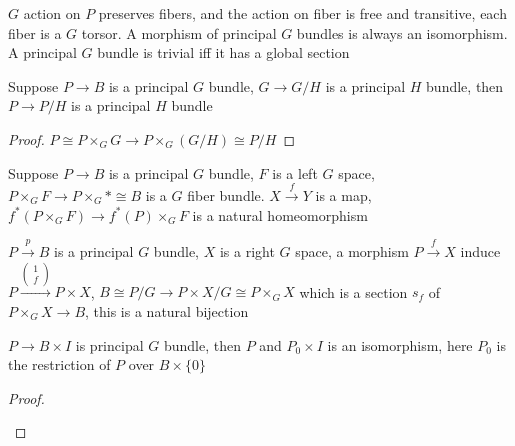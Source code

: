 \documentclass[main]{subfiles}
\begin{document}
\begin{remark}
$G$ action on $P$ preserves fibers, and the action on fiber is free and transitive, each fiber is a $G$ torsor. A morphism of principal $G$ bundles is always an isomorphism. A principal $G$ bundle is trivial iff it has a global section
\end{remark}

\begin{proposition}
Suppose $P\to B$ is a principal $G$ bundle, $G\to G/H$ is a principal $H$ bundle, then $P\to P/H$ is a principal $H$ bundle
\end{proposition}

\begin{proof}
$P\cong P\times_GG\to P\times_G(G/H)\cong P/H$
\end{proof}

\begin{proposition}
Suppose $P\to B$ is a principal $G$ bundle, $F$ is a left $G$ space, $P\times_GF\to P\times_G*\cong B$ is a $G$ fiber bundle. $X\xrightarrow{f}Y$ is a map, $f^*(P\times_G F)\to f^*(P)\times_GF$ is a natural homeomorphism
\end{proposition}

\begin{proposition}
$P\xrightarrow{p}B$ is a principal $G$ bundle, $X$ is a right $G$ space, a morphism $P\xrightarrow{f}X$ induce $P\xrightarrow{\begin{pmatrix}
1 \\
f
\end{pmatrix}} P\times X$, $B\cong P/G\to P\times X/G\cong P\times_GX$ which is a section $s_f$ of $P\times_G X\to B$, this is a natural bijection 
\end{proposition}

\begin{proposition}
$P\to B\times I$ is principal $G$ bundle, then $P$ and $P_0\times I$ is an isomorphism, here $P_0$ is the restriction of $P$ over $B\times\{0\}$
\end{proposition}

\begin{proof}
\begin{center}
\end{center}
\end{proof}
\end{document}
